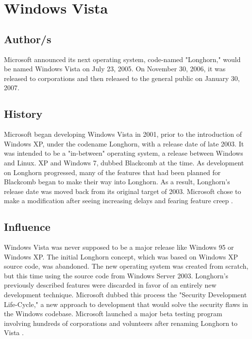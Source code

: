 \documentclass[a4paper, 12pt]{article}
\begin{document}
\newpage
\newpage
\section{Windows Vista}

\subsection{Author/s}
Microsoft announced its next operating system, code-named "Longhorn," would be named Windows Vista on July 23, 2005. On November 30, 2006, it was released to corporations and then released to the general public on January 30, 2007.

\subsection{History}
Microsoft began developing Windows Vista in 2001, prior to the introduction of Windows XP, under the codename Longhorn, with a release date of late 2003. It was intended to be a "in-between" operating system, a release between Windows and Linux. XP and Windows 7, dubbed Blackcomb at the time. As development on Longhorn progressed, many of the features that had been planned for Blackcomb began to make their way into Longhorn. As a result, Longhorn's release date was moved back from its original target of 2003. Microsoft chose to make a modification after seeing increasing delays and fearing feature creep \parencite{gatesguide}.

\subsection{Influence}
Windows Vista was never supposed to be a major release like Windows 95 or Windows XP. The initial Longhorn concept, which was based on Windows XP source code, was abandoned. The new operating system was created from scratch, but this time using the source code from Windows Server 2003. Longhorn's previously described features were discarded in favor of an entirely new development technique. Microsoft dubbed this process the "Security Development Life-Cycle," a new approach to development that would solve the security flaws in the Windows codebase. Microsoft launched a major beta testing program involving hundreds of corporations and volunteers after renaming Longhorn to Vista \parencite{torres2008unofficial}.

\end{document}
